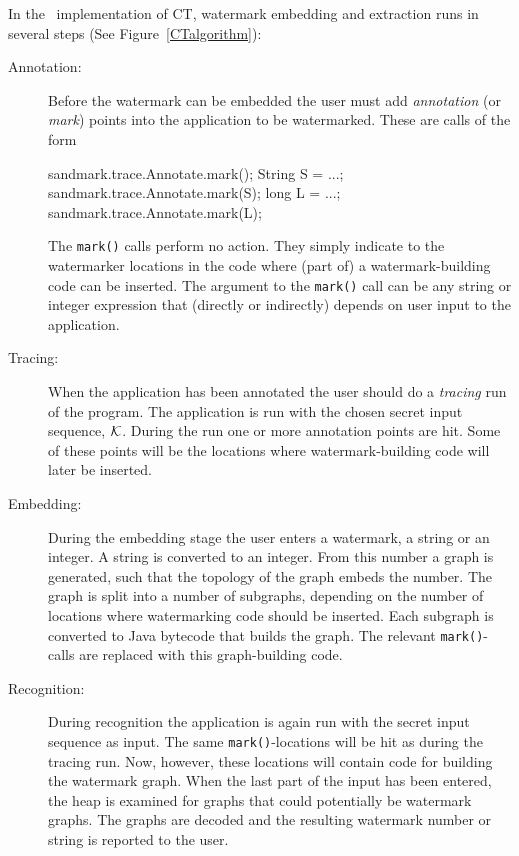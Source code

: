 In the \SM\ implementation of {\sf CT}, watermark embedding
and extraction runs in several steps (See Figure~\ref{CTalgorithm}):
\begin{description}
   \item[Annotation:] Before the watermark can be embedded
       the user must add {\em annotation} (or {\em mark})
       points into the application to be watermarked. These
       are calls of the form
\begin{listing}{1}
   sandmark.trace.Annotate.mark();
   String S = ...;
   sandmark.trace.Annotate.mark(S);
   long L = ...;
   sandmark.trace.Annotate.mark(L);
\end{listing}
       The {\tt mark()} calls perform no action. They 
       simply indicate to the watermarker locations in
       the code where (part of) a watermark-building 
       code can be inserted. The argument to the {\tt mark()}
       call can be any string or integer expression
       that (directly or indirectly) depends on user
       input to the application.
   \item[Tracing:] When the application has been annotated
      the user should do a {\em tracing} run of the program. 
      The application is run with the chosen secret input sequence,
      $\cal K$. During the run one or more annotation points are hit. 
      Some of these points will be the locations where watermark-building 
      code will later be inserted.  
   \item[Embedding:] 
      During the embedding stage the user enters a watermark,
      a string or an integer. A string is converted to an integer.
      From this number a graph is generated, such that the
      topology of the graph embeds the number. The graph is
      split into a number of subgraphs, depending on the
      number of locations where watermarking code should be
      inserted. Each subgraph is converted to Java bytecode
      that builds the graph. The relevant {\tt mark()}-calls 
      are replaced with this graph-building code.
   \item[Recognition:] 
      During recognition the application is again run with
      the secret input sequence as input. The same 
      {\tt mark()}-locations will be hit as during the
      tracing run. Now, however, these locations 
      will contain code for building the watermark graph.
      When the last part of the input has been entered,
      the heap is examined for graphs that could 
      potentially be watermark graphs. The graphs are
      decoded and the resulting watermark number or
      string is reported to the user.
\end{description}

